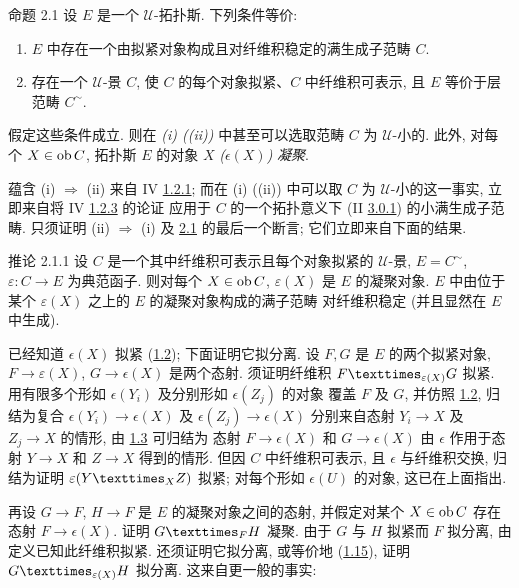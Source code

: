 \begin{enonce*}{命题 2.1}
设 $E$ 是一个 $𝒰$-拓扑斯.
下列条件等价:
\begin{enumerate}
\renewcommand{\theenumi}{\roman{enumi}}
\renewcommand{\labelenumi}{(\theenumi)}
\item $E$ 中存在一个由拟紧对象构成且对纤维积稳定的满生成子范畴 $C$.

\item 存在一个 $𝒰$-景 $C$,
使 $C$ 的每个对象拟紧、$C$ 中纤维积可表示,
且 $E$ 等价于层范畴 $C^{\sim}$.
\end{enumerate}

假定这些条件成立.
则在 \emph{(i) (\resp (ii))} 中甚至可以选取范畴 $C$ 为 $𝒰$-小的.
此外, 对每个 $X\in\operatorname{ob} C$,
拓扑斯 $E$ 的对象 $X$ \emph{(\resp $\epsilon(X)$)} \emph{凝聚}.
\end{enonce*}

蕴含 (i) $\Rightarrow$ (ii) 来自 IV \hyperref[IV.cor1.2.1]{1.2.1};
而在 (i) (\resp (ii)) 中可以取 $C$ 为 $𝒰$-小的这一事实,
立即来自将 IV \hyperref[IV.subsubsec1.2.3]{1.2.3} 的论证
应用于 $C$ 的一个拓扑意义下
(II \hyperref[II.def3.0.1]{3.0.1}) 的小满生成子范畴.
只须证明 (ii) $\Rightarrow$ (i)
及 \hyperref[VI.prop2.1]{2.1} 的最后一个断言;
它们立即来自下面的结果.

\begin{enonce*}{推论 2.1.1}
设\pageoriginale{} $C$ 是一个其中纤维积可表示且每个对象拟紧的 $𝒰$-景,
$E=C^{\sim}$, $\varepsilon:C\to E$ 为典范函子.
则对每个 $X\in\operatorname{ob} C$, $\varepsilon(X)$ 是 $E$ 的凝聚对象.
$E$ 中由位于某个 $\varepsilon(X)$ 之上的 $E$ 的凝聚对象构成的满子范畴
对纤维积稳定 (并且显然在 $E$ 中生成).
\end{enonce*}

已经知道 $\epsilon(X)$ 拟紧 (\hyperref[VI.prop1.2]{1.2});
下面证明它拟分离.
设 $F,G$ 是 $E$ 的两个拟紧对象,
$F\to\varepsilon(X)$, $G\to\epsilon(X)$ 是两个态射.
须证明纤维积 $\fprod{F}{G}{\epsilon(X)}$ 拟紧.
用有限多个形如 $\epsilon(Y_i)$ 及分别形如 $\epsilon(Z_j)$ 的对象
覆盖 $F$ 及 $G$,
并仿照 \hyperref[VI.prop1.2]{1.2},
归结为复合 $\epsilon(Y_i)\to\epsilon(X)$
及 $\epsilon(Z_j)\to\epsilon(X)$
分别来自态射 $Y_i\to X$ 及 $Z_j\to X$ 的情形,
由 \hyperref[VI.prop1.3]{1.3} 可归结为
态射 $F\to\epsilon(X)$ 和 $G\to\epsilon(X)$
由 $\epsilon$ 作用于态射 $Y\to X$ 和 $Z\to X$ 得到的情形.
但因 $C$ 中纤维积可表示, 且 $\epsilon$ 与纤维积交换,
归结为证明 $\epsilon(\fprod{Y}{Z}{X})$ 拟紧;
对每个形如 $\epsilon(U)$ 的对象, 这已在上面指出.

再设 $G\to F$, $H\to F$ 是 $E$ 的凝聚对象之间的态射,
并假定对某个 $X\in\operatorname{ob} C$ 存在态射 $F\to\epsilon(X)$.
证明 $\fprod{G}{H}{F}$ 凝聚.
由于 $G$ 与 $H$ 拟紧而 $F$ 拟分离,
由定义已知此纤维积拟紧.
还须\pageoriginale{}证明它拟分离,
或等价地 (\hyperref[VI.cor1.15]{1.15}),
证明 $\fprod{G}{H}{\epsilon(X)}$ 拟分离.
这来自更一般的事实:

